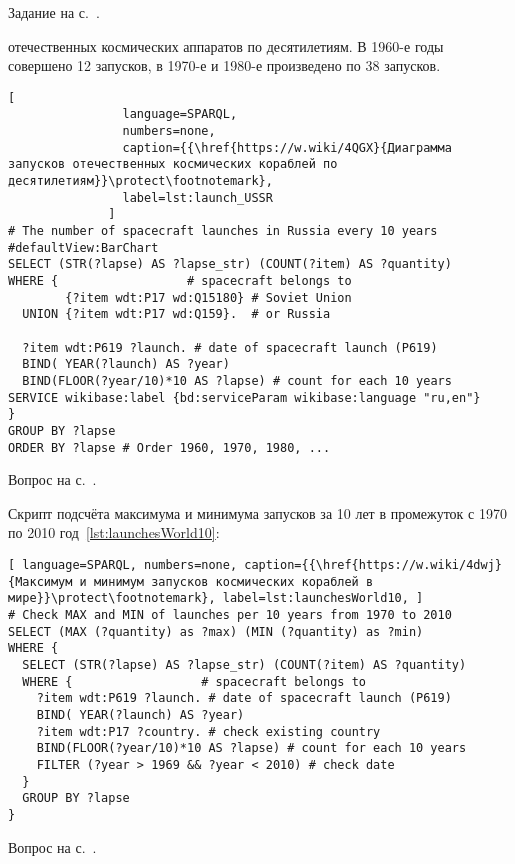 \begin{task}
\small{Задание на с.~\pageref{question:ship_3}.}
\end{task}


\begin{task}
    \label{answer:launches_USSR}
     отечественных космических аппаратов по десятилетиям.
    В 1960-е годы совершено 12 запусков, в 1970-е и 1980-е произведено по 38 запусков.

    \begin{lstlisting}[ 
                language=SPARQL, 
                numbers=none, 
                caption={{\href{https://w.wiki/4QGX}{Диаграмма запусков отечественных космических кораблей по десятилетиям}}\protect\footnotemark}, 
                label=lst:launch_USSR
              ]
# The number of spacecraft launches in Russia every 10 years
#defaultView:BarChart
SELECT (STR(?lapse) AS ?lapse_str) (COUNT(?item) AS ?quantity)
WHERE {                  # spacecraft belongs to
        {?item wdt:P17 wd:Q15180} # Soviet Union
  UNION {?item wdt:P17 wd:Q159}.  # or Russia
  
  ?item wdt:P619 ?launch. # date of spacecraft launch (P619)
  BIND( YEAR(?launch) AS ?year) 
  BIND(FLOOR(?year/10)*10 AS ?lapse) # count for each 10 years
SERVICE wikibase:label {bd:serviceParam wikibase:language "ru,en"}
} 
GROUP BY ?lapse
ORDER BY ?lapse # Order 1960, 1970, 1980, ...    \end{lstlisting}
    \small{Вопрос на с.~\pageref{question:spacecraft_1}.}
\end{task}

\begin{task}
    \label{answer:launches_world}
    Скрипт подсчёта максимума и минимума запусков за 10 лет в промежуток с 1970 по 2010 год~\ref{lst:launchesWorld10}:
    \begin{lstlisting}[ language=SPARQL, numbers=none, caption={{\href{https://w.wiki/4dwj}{Максимум и минимум запусков космических кораблей в мире}}\protect\footnotemark}, label=lst:launchesWorld10, ]
# Check MAX and MIN of launches per 10 years from 1970 to 2010
SELECT (MAX (?quantity) as ?max) (MIN (?quantity) as ?min)
WHERE {
  SELECT (STR(?lapse) AS ?lapse_str) (COUNT(?item) AS ?quantity)
  WHERE {                  # spacecraft belongs to
    ?item wdt:P619 ?launch. # date of spacecraft launch (P619)
    BIND( YEAR(?launch) AS ?year) 
    ?item wdt:P17 ?country. # check existing country
    BIND(FLOOR(?year/10)*10 AS ?lapse) # count for each 10 years
    FILTER (?year > 1969 && ?year < 2010) # check date
  } 
  GROUP BY ?lapse
} \end{lstlisting}
    \small{Вопрос на с.~\pageref{question:spacecraft_2}.}
\end{task}

